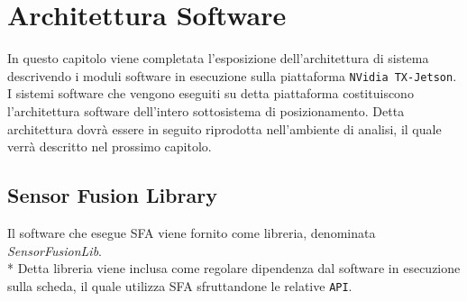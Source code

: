 \chapter{Architettura Software}
In questo capitolo viene completata l'esposizione dell'architettura di sistema descrivendo i moduli software in esecuzione sulla piattaforma \texttt{NVidia TX-Jetson}. I sistemi software che vengono eseguiti su detta piattaforma costituiscono l'architettura software dell'intero sottosistema di posizionamento. Detta architettura dovr\`a essere in seguito riprodotta nell'ambiente di analisi, il quale verr\`a descritto nel prossimo capitolo.
\section{Sensor Fusion Library}
Il software che esegue SFA viene fornito come libreria, denominata \textit{SensorFusionLib}.\\*
Detta libreria viene inclusa come regolare dipendenza dal software in esecuzione sulla scheda, il quale utilizza SFA sfruttandone le relative \texttt{API}.
